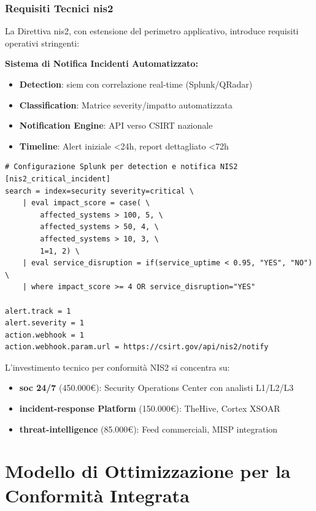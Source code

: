 \subsubsection{\texorpdfstring{Requisiti Tecnici \gls{nis2}}{4.2.2.2 - Requisiti Tecnici NIS2}}

La Direttiva \gls{nis2}, con estensione del perimetro applicativo, introduce requisiti operativi stringenti\autocite{ENISA2024nis2}:

\textbf{Sistema di Notifica Incidenti Automatizzato:}
\begin{itemize}
    \item \textbf{Detection}: \gls{siem} con correlazione real-time (Splunk/QRadar)
    \item \textbf{Classification}: Matrice severity/impatto automatizzata
    \item \textbf{Notification Engine}: API verso CSIRT nazionale
    \item \textbf{Timeline}: Alert iniziale <24h, report dettagliato <72h
\end{itemize}

\begin{lstlisting}[caption={Pipeline Notifica \gls{nis2}},label={lst:nis2_notification}]
# Configurazione Splunk per detection e notifica NIS2
[nis2_critical_incident]
search = index=security severity=critical \
    | eval impact_score = case( \
        affected_systems > 100, 5, \
        affected_systems > 50, 4, \
        affected_systems > 10, 3, \
        1=1, 2) \
    | eval service_disruption = if(service_uptime < 0.95, "YES", "NO") \
    | where impact_score >= 4 OR service_disruption="YES"

alert.track = 1
alert.severity = 1
action.webhook = 1
action.webhook.param.url = https://csirt.gov/api/nis2/notify
\end{lstlisting}

L'investimento tecnico per conformità NIS2 si concentra su:
\begin{itemize}
    \item \textbf{\gls{soc} 24/7} (450.000€): Security Operations Center con analisti L1/L2/L3
    \item \textbf{\gls{incident-response} Platform} (150.000€): TheHive, Cortex XSOAR
    \item \textbf{\gls{threat-intelligence}} (85.000€): Feed commerciali, MISP integration
\end{itemize}
\section{\texorpdfstring{Modello di Ottimizzazione per la Conformità Integrata}{4.3 - Modello di Ottimizzazione per la Conformità Integrata}}


